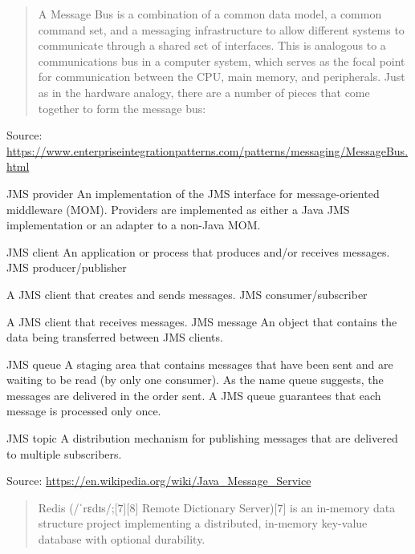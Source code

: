 \documentclass[Screen16to9,17pt]{foils}
\begin{document}


\begin{quote}\footnotesize
A Message Bus is a combination of a common data model, a common command set, and a messaging infrastructure to allow different systems to communicate through a shared set of interfaces. This is analogous to a communications bus in a computer system, which serves as the focal point for communication between the CPU, main memory, and peripherals. Just as in the hardware analogy, there are a number of pieces that come together to form the message bus:
\end{quote}
Source: \url{https://www.enterpriseintegrationpatterns.com/patterns/messaging/MessageBus.html}



\begin{list2}
\item JMS provider
An implementation of the JMS interface for message-oriented middleware (MOM). Providers are implemented as either a Java JMS implementation or an adapter to a non-Java MOM.
\item JMS client
An application or process that produces and/or receives messages.
JMS producer/publisher
\item A JMS client that creates and sends messages.
JMS consumer/subscriber
\item A JMS client that receives messages.
JMS message
An object that contains the data being transferred between JMS clients.
\item JMS queue
A staging area that contains messages that have been sent and are waiting to be read (by only one consumer). As the name queue suggests, the messages are delivered in the order sent. A JMS queue guarantees that each message is processed only once.
\item JMS topic
A distribution mechanism for publishing messages that are delivered to multiple subscribers.
\end{list2}
Source: \url{https://en.wikipedia.org/wiki/Java_Message_Service}



\begin{quote}
Redis (/ˈrɛdɪs/;[7][8] Remote Dictionary Server)[7] is an in-memory data structure
project implementing a distributed, in-memory key-value database with optional durability.
\end{quote}
\end{document}
